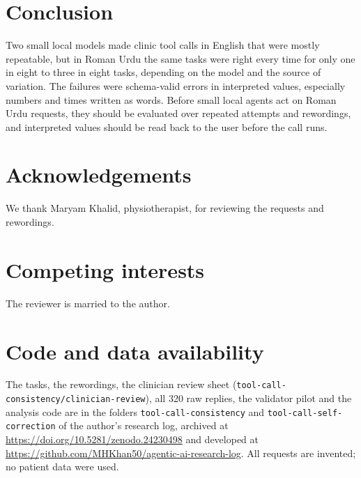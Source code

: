 \documentclass[11pt,a4paper]{article}
\newcommand{\code}[1]{\texttt{#1}}
\begin{document}
\section{Conclusion}

Two small local models made clinic tool calls in English that were mostly repeatable, but in Roman Urdu the same
tasks were right every time for only one in eight to three in eight tasks, depending on the model and the source of
variation. The failures were schema-valid errors in interpreted values, especially numbers and times written as
words. Before small local agents act on Roman Urdu requests, they should be evaluated over repeated attempts and
rewordings, and interpreted values should be read back to the user before the call runs.

\section*{Acknowledgements}
We thank Maryam Khalid, physiotherapist, for reviewing the requests and rewordings.

\section*{Competing interests}
The reviewer is married to the author.

\section*{Code and data availability}

The tasks, the rewordings, the clinician review sheet (\code{tool-call-consistency/clinician-review}), all 320 raw replies, the validator pilot and the analysis code are in the folders
\code{tool-call-consistency} and \code{tool-call-self-correction} of the author's research log, archived at
\url{https://doi.org/10.5281/zenodo.24230498} and developed at \url{https://github.com/MHKhan50/agentic-ai-research-log}.
All requests are invented; no patient data were used.



\end{document}

